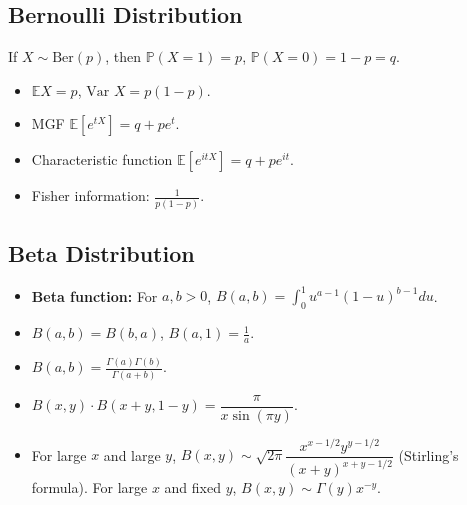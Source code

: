 \documentclass[twoside]{article}
\newcommand\bbE{\mathbb{E}}
\newcommand\bbP{\mathbb{P}}
\newcommand\var{\text{Var }}
\begin{document}
\subsection{Bernoulli Distribution}
If $X \sim \text{Ber}(p)$, then $\bbP(X = 1) = p$, $\bbP(X = 0) = 1-p = q$.
\begin{itemize}
\item $\bbE X = p$, $\var X = p(1-p)$.

\item MGF $\bbE [e^{tX}] = q + pe^t$.

\item Characteristic function $\bbE [e^{itX}] = q + pe^{it}$.

\item Fisher information: $\displaystyle\frac{1}{p(1-p)}$.
\end{itemize}

\subsection{Beta Distribution}
\begin{itemize}
\item \textbf{Beta function:} For $a, b > 0$, $B(a,b) = \displaystyle\int_0^1 u^{a-1}(1-u)^{b-1} du$.

\item $B(a,b) = B(b,a)$, $B(a,1) = \displaystyle\frac{1}{a}$.

\item $B(a,b) = \displaystyle\frac{\Gamma (a) \Gamma (b)}{\Gamma(a + b)}$.

\item $B(x,y) \cdot B(x+y, 1-y) = \dfrac{\pi}{x \sin(\pi y)}$.

\item For large $x$ and large $y$, $B(x,y) \sim \sqrt{2\pi} \dfrac{x^{x-1/2}y^{y-1/2}}{(x+y)^{x+y - 1/2}}$ (Stirling's formula). For large $x$ and fixed $y$, $B(x,y) \sim \Gamma(y) x^{-y}$.

\end{itemize}
\end{document}
